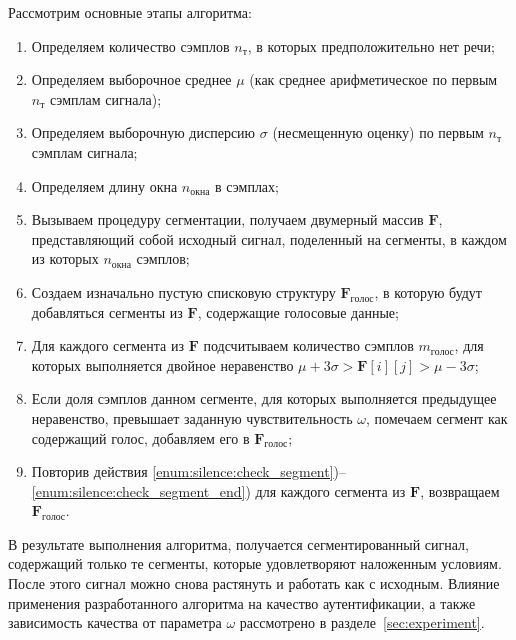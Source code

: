 Рассмотрим основные этапы алгоритма:

\begin{enumerate}
\item Определяем количество сэмплов $n_т$, в которых предположительно нет речи;
\item Определяем выборочное среднее $\mu$ (как среднее арифметическое по первым $n_т$ сэмплам сигнала);
\item Определяем выборочную дисперсию $\sigma$ (несмещенную оценку) по первым $n_т$ сэмплам сигнала;
\item Определяем длину окна $n_{окна}$ в сэмплах;
\item Вызываем процедуру сегментации, получаем двумерный массив $\mathbf{F}$, представляющий собой исходный сигнал, поделенный на сегменты, в каждом из которых $n_{окна}$ сэмплов;
\item Создаем изначально пустую списковую структуру $\mathbf{F}_{голос}$, в которую будут добавляться сегменты из $\mathbf{F}$, содержащие голосовые данные;
\item \label{enum:silence:check_segment} Для каждого сегмента из $\mathbf{F}$ подсчитываем количество сэмплов $m_{голос}$, для которых выполняется двойное неравенство $\mu\!+\!3\sigma > \mathbf{F}[i][j] > \mu\!-\!3\sigma$;
\item \label{enum:silence:check_segment_end} Если доля сэмплов данном сегменте, для которых выполняется предыдущее неравенство, превышает заданную чувствительность $\omega$, помечаем сегмент как содержащий голос, добавляем его в $\mathbf{F}_{голос}$;
\item Повторив действия \ref{enum:silence:check_segment})--\ref{enum:silence:check_segment_end}) для каждого сегмента из $\textbf{F}$, возвращаем $\mathbf{F}_{голос}$.
\end{enumerate}

В результате выполнения алгоритма, получается сегментированный сигнал, содержащий только те сегменты, которые удовлетворяют наложенным условиям. После этого сигнал можно снова растянуть и работать как с исходным. Влияние применения разработанного алгоритма на качество аутентификации, а также зависимость качества от параметра $\omega$ рассмотрено в разделе~\ref{sec:experiment}.

